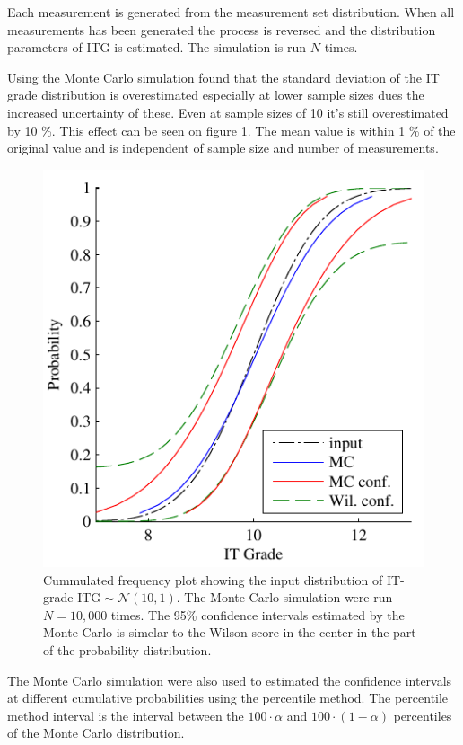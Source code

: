 \documentclass[aip,amsmath, preprint, author-year]{revtex4-1}
\begin{document}
Each measurement is generated from the measurement set distribution.
When all measurements has been generated the process is reversed and the distribution parameters of ITG is estimated.
The simulation is run $N$ times.

Using the Monte Carlo simulation found that the standard deviation of the IT grade distribution is overestimated especially at lower sample sizes dues the increased uncertainty of these. 
Even at sample sizes of 10 it's still overestimated by 10 \%. 
This effect can be seen on figure \ref{fig:confidenceIntervals}. The mean value is within 1 \% of the original value and is independent of sample size and number of measurements.  

\begin{figure}
\includegraphics{confidenceIntervals.pdf}
\caption{\label{fig:confidenceIntervals}Cummulated frequency plot showing the input distribution of IT-grade $\mathrm{ITG} \sim \mathcal{N} (10, 1)$. 
The Monte Carlo simulation were run $N = 10,000$ times. 
The 95\% confidence intervals estimated by the Monte Carlo is simelar to the Wilson score in the center in the part of the probability distribution.}
\end{figure}

The Monte Carlo simulation were also used to estimated the confidence intervals at different cumulative probabilities using the percentile method.
The percentile method interval is the interval between the $100 \cdot \alpha$ and $100 \cdot (1-\alpha)$ percentiles of the Monte Carlo distribution. 
\end{document}
